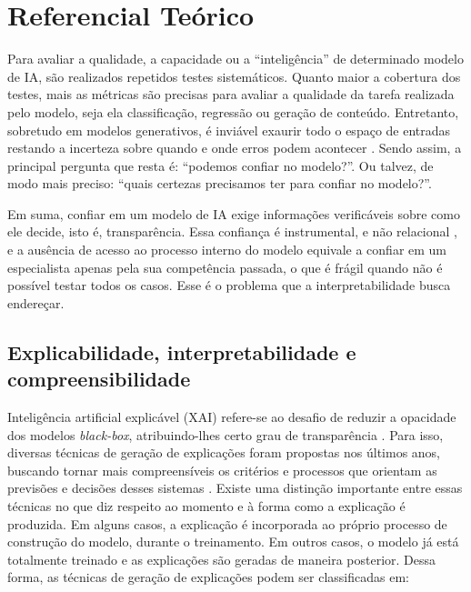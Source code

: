 \section{Referencial Teórico}\label{sec:referencial}

Para avaliar a qualidade, a capacidade ou a ``inteligência'' de determinado modelo de IA, são realizados repetidos testes sistemáticos. Quanto maior a cobertura dos testes, mais as métricas são precisas para avaliar a qualidade da tarefa realizada pelo modelo, seja ela classificação, regressão ou geração de conteúdo. Entretanto, sobretudo em modelos generativos, é inviável exaurir todo o espaço de entradas restando a incerteza sobre quando e onde erros podem acontecer \citep{Yu2025}. Sendo assim, a principal pergunta que resta é: ``podemos confiar no modelo?''. Ou talvez, de modo mais preciso: ``quais certezas precisamos ter para confiar no modelo?''.

Em suma, confiar em um modelo de IA exige informações verificáveis sobre como ele decide, isto é, transparência. Essa confiança é instrumental, e não relacional \citep{Mitchell2025}, e a ausência de acesso ao processo interno do modelo equivale a confiar em um especialista apenas pela sua competência passada, o que é frágil quando não é possível testar todos os casos. Esse é o problema que a interpretabilidade busca endereçar.

\subsection{Explicabilidade, interpretabilidade e compreensibilidade}

Inteligência artificial explicável (XAI) refere-se ao desafio de reduzir a opacidade dos modelos \textit{black-box}, atribuindo-lhes certo grau de transparência \citep{Longo2024, ICO2022}. Para isso, diversas técnicas de geração de explicações foram propostas nos últimos anos, buscando tornar mais compreensíveis os critérios e processos que orientam as previsões e decisões desses sistemas \citep{Mersha2024, Guidotti2022, Longo2024, Marino2025}. Existe uma distinção importante entre essas técnicas no que diz respeito ao momento e à forma como a explicação é produzida. Em alguns casos, a explicação é incorporada ao próprio processo de construção do modelo, durante o treinamento. Em outros casos, o modelo já está totalmente treinado e as explicações são geradas de maneira posterior. Dessa forma, as técnicas de geração de explicações podem ser classificadas em:

